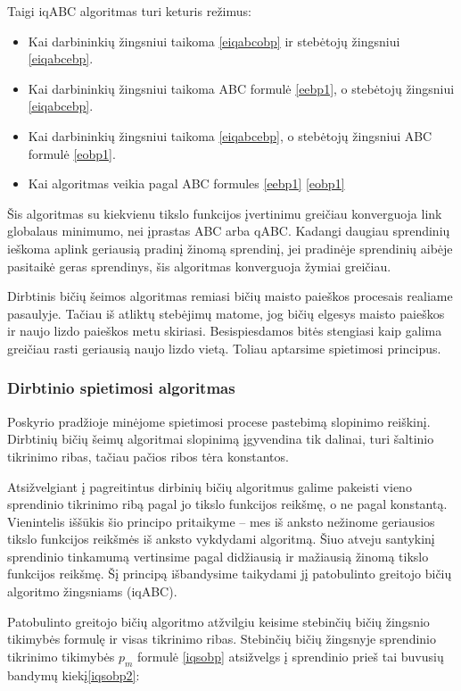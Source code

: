 \documentclass{VUMIFKompMagistrinis}
\begin{document}
Taigi iqABC algoritmas turi keturis režimus:
\begin{itemize}
    \item Kai darbininkių žingsniui taikoma \eqref{eiqabcobp} ir stebėtojų žingsniui \eqref{eiqabcebp}.
    \item Kai darbininkių žingsniui taikoma ABC formulė \eqref{eebp1}, o stebėtojų žingsniui \eqref{eiqabcebp}.
    \item Kai darbininkių žingsniui taikoma \eqref{eiqabcebp}, o stebėtojų žingsniui ABC formulė \eqref{eobp1}.
    \item Kai algoritmas veikia pagal ABC formules \eqref{eebp1}  \eqref{eobp1}
\end{itemize}

Šis algoritmas su kiekvienu tikslo funkcijos įvertinimu greičiau konverguoja link globalaus minimumo, nei įprastas ABC arba qABC. Kadangi daugiau sprendinių ieškoma aplink geriausią pradinį žinomą sprendinį, jei pradinėje sprendinių aibėje pasitaikė geras sprendinys, šis algoritmas konverguoja žymiai greičiau.

Dirbtinis bičių šeimos algoritmas remiasi bičių maisto paieškos procesais realiame pasaulyje. Tačiau iš atliktų stebėjimų matome, jog bičių elgesys maisto paieškos ir naujo lizdo paieškos metu skiriasi. Besispiesdamos bitės stengiasi kaip galima greičiau rasti geriausią naujo lizdo vietą. Toliau aptarsime spietimosi principus.


\subsubsection{Dirbtinio spietimosi algoritmas}

Poskyrio pradžioje minėjome spietimosi procese pastebimą slopinimo reiškinį. Dirbtinių bičių šeimų algoritmai slopinimą įgyvendina tik dalinai, turi šaltinio tikrinimo ribas, tačiau pačios ribos tėra konstantos.

Atsižvelgiant į pagreitintus dirbinių bičių algoritmus galime pakeisti vieno sprendinio tikrinimo ribą pagal jo tikslo funkcijos reikšmę, o ne pagal konstantą. Vienintelis iššūkis šio principo pritaikyme – mes iš anksto nežinome geriausios tikslo funkcijos reikšmės iš anksto vykdydami algoritmą. Šiuo atveju santykinį sprendinio tinkamumą vertinsime pagal didžiausią ir mažiausią žinomą tikslo funkcijos reikšmę. Šį principą išbandysime taikydami jį patobulinto greitojo bičių algoritmo žingsniams (iqABC).

Patobulinto greitojo bičių algoritmo atžvilgiu keisime stebinčių bičių žingsnio tikimybės formulę ir visas tikrinimo ribas. Stebinčių bičių žingsnyje sprendinio tikrinimo tikimybės  $p_{m}$ formulė \eqref{iqsobp} atsižvelgs į sprendinio prieš tai buvusių bandymų kiekį\eqref{iqsobp2}:
\end{document}

